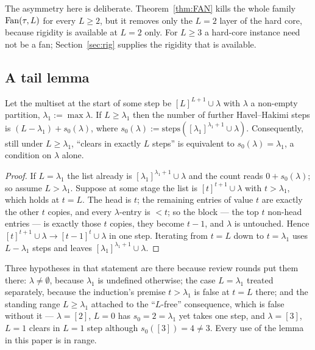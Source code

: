The asymmetry here is deliberate. Theorem~\ref{thm:FAN} kills the whole family
$\mathrm{Fan}(\tau,L)$ for every $L \ge 2$, but it removes only the $L = 2$ layer of the hard core,
because rigidity is available at $L = 2$ only. For $L \ge 3$ a hard-core instance need not
be a fan; Section~\ref{sec:rig} supplies the rigidity that is available.

\subsection{A tail lemma}

\begin{lemma}[tail]\label{lem:TAIL}
Let the multiset at the start of some step be $[L]^{L+1} \cup \lambda$ with $\lambda$ a
non-empty partition, $\lambda_1 := \max \lambda$. If $L \ge \lambda_1$ then the number of
further Havel--Hakimi steps is $(L - \lambda_1) + s_0(\lambda)$, where
$s_0(\lambda) := \mathrm{steps}([\lambda_1]^{\lambda_1+1} \cup \lambda)$. Consequently,
still under $L \ge \lambda_1$, ``clears in exactly $L$ steps'' is equivalent to
$s_0(\lambda) = \lambda_1$, a condition on $\lambda$ alone.
\end{lemma}

\begin{proof}
If $L = \lambda_1$ the list already is $[\lambda_1]^{\lambda_1+1} \cup \lambda$ and the
count reads $0 + s_0(\lambda)$; so assume $L > \lambda_1$. Suppose at some stage the list is
$[t]^{t+1} \cup \lambda$ with $t > \lambda_1$, which holds at $t = L$. The head is $t$; the
remaining entries of value $t$ are exactly the other $t$ copies, and every $\lambda$-entry
is $< t$; so the block --- the top $t$ non-head entries --- is exactly those $t$ copies,
they become $t-1$, and $\lambda$ is untouched. Hence
$[t]^{t+1} \cup \lambda \to [t-1]^{t} \cup \lambda$ in one step. Iterating from $t = L$
down to $t = \lambda_1$ uses $L - \lambda_1$ steps and leaves
$[\lambda_1]^{\lambda_1+1} \cup \lambda$.
\end{proof}

Three hypotheses in that statement are there because review rounds put them there:
$\lambda \ne \emptyset$, because $\lambda_1$ is undefined otherwise; the case $L = \lambda_1$
treated separately, because the induction's premise $t > \lambda_1$ is false at $t = L$
there; and the standing range $L \ge \lambda_1$ attached to the ``$L$-free'' consequence,
which is false without it --- $\lambda = [2]$, $L = 0$ has $s_0 = 2 = \lambda_1$ yet takes
one step, and $\lambda = [3]$, $L = 1$ clears in $L = 1$ step although
$s_0([3]) = 4 \ne 3$. Every use of the lemma in this paper is in range.

